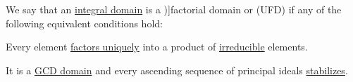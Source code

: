 \begin{definition}\label{def:factorial_domain}
  We say that an \hyperref[def:integral_domain]{integral domain} is a \term[ru=факториальное кольцо (\cite[def. 9.7.1]{Винберг2014КурсАлгебры})]{factorial domain} or  (UFD) if any of the following equivalent conditions hold:
  \begin{thmenum}
     Every element \hyperref[def:irreducible_factorization/unique]{factors uniquely} into a product of \hyperref[def:domain_divisibility/irreducible]{irreducible} elements.

     It is a \hyperref[def:gcd_domain]{GCD domain} and every ascending sequence of principal ideals \hyperref[def:stabilizing_sequence]{stabilizes}.
  \end{thmenum}
\end{definition}

